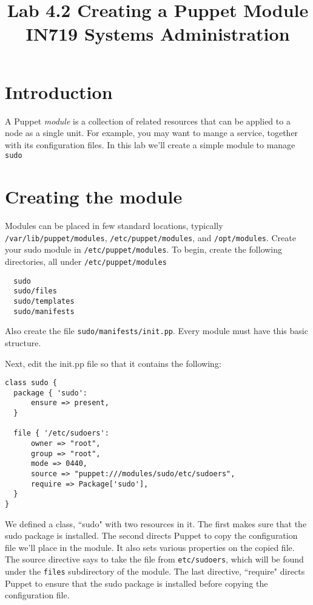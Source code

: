 \documentclass{article}   	%
\title{Lab 4.2 Creating a Puppet Module \\ IN719 Systems Administration}
\begin{document}
\maketitle

\section*{Introduction}
A Puppet \emph{module} is a collection of related resources that can be applied to a node as a single unit. For example, you may want to mange a service, together with its configuration files.  In this lab we'll create a simple module to manage \texttt{sudo}

\section*{Creating the module}
Modules can be placed in few standard locations, typically \texttt{/var/lib/puppet/modules}, \texttt{/etc/puppet/modules}, and \texttt{/opt/modules}.  Create your sudo module in \texttt{/etc/puppet/modules}.  To begin, create the following directories, all under \texttt{/etc/puppet/modules}
\begin{verbatim}
  sudo
  sudo/files
  sudo/templates
  sudo/manifests
\end{verbatim}
Also create the file \texttt{sudo/manifests/init.pp}.  Every module must have this basic structure.

Next, edit the init.pp file so that it contains the following:

\newpage

\begin{verbatim}
class sudo {
  package { 'sudo':
      ensure => present,
  }

  file { '/etc/sudoers':
      owner => "root",
      group => "root",
      mode => 0440,
      source => "puppet:///modules/sudo/etc/sudoers",
      require => Package['sudo'],
  }
}
\end{verbatim}

We defined a class, ``sudo" with two resources in it.  The first makes sure that the sudo package is installed.  The second directs Puppet to copy the configuration file we'll place in the module.  It also sets various properties on the copied file.  The source directive says to take the file from \texttt{etc/sudoers}, which will be found under the \texttt{files} subdirectory of the module.  The last directive, ``require" directs Puppet to ensure that the sudo package is installed before copying the configuration file.
\end{document}
